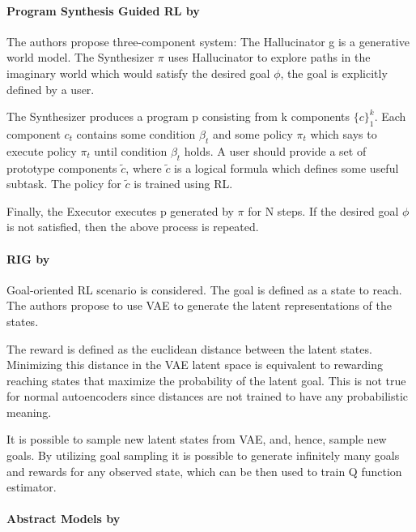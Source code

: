 \documentclass[acmsmall, nonacm]{acmart}
\begin{document}

\paragraph{Program Synthesis Guided RL by \citet{Yang2021ProgramSG}}

The authors propose three-component system: The Hallucinator g is a generative world model. The Synthesizer $\pi$ uses Hallucinator to explore paths in the imaginary world which would satisfy the desired goal $\phi$, the goal is explicitly defined by a user.

The Synthesizer produces a program p consisting from k components $\{c\}_1^k$. Each component $c_t$ contains some condition $\beta_t$ and some policy $\pi_t$ which says to execute policy $\pi_t$ until condition $\beta_t$ holds. A user should provide a set of prototype components $\tilde{c}$, where $\tilde{c}$ is a logical formula which defines some useful subtask. The policy for $\tilde{c}$ is trained using RL.

Finally, the Executor executes p generated by $\pi$ for N steps. If the desired goal $\phi$ is not satisfied, then the above process is repeated.


\paragraph{RIG by \citet{Nair2018VisualRL}}

Goal-oriented RL scenario is considered. The goal is defined as a state to reach. The authors propose to use VAE to generate the latent representations of the states.

The reward is defined as the euclidean distance between the latent states. Minimizing this distance in the VAE latent space is equivalent to rewarding reaching states that maximize the probability of the latent goal. This is not true for normal autoencoders since distances are not trained to have any probabilistic meaning.

It is possible to sample new latent states from VAE, and, hence, sample new goals. By utilizing goal sampling it is possible to generate infinitely many goals and rewards for any observed state, which can be then used to train Q function estimator.


\paragraph{Abstract Models by \citet{liu2019learning}}
\end{document}
